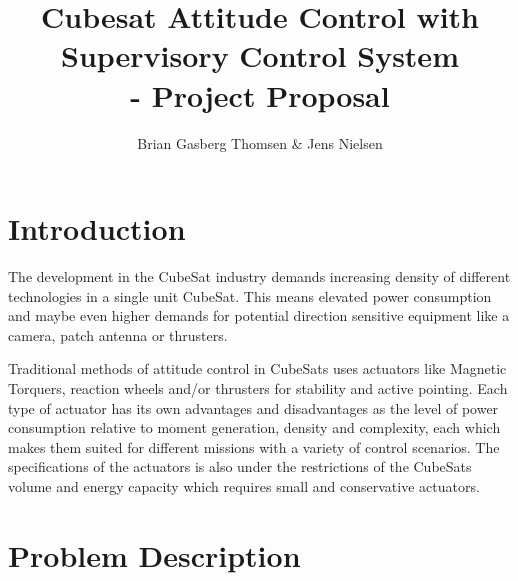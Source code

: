 \documentclass[10pt,a4paper,oneside,openany,article]{memoir}
\title{\vspace{-2cm} Cubesat Attitude Control with Supervisory Control System \\ \Large - Project Proposal}
\author{Brian Gasberg Thomsen \& Jens Nielsen}
\begin{document}
\maketitle

\chapter{Introduction}
The development in the CubeSat industry demands increasing density of different technologies in a single unit CubeSat. This means elevated power consumption and maybe even higher demands for potential direction sensitive equipment like a camera, patch antenna or thrusters. 

Traditional methods of attitude control in CubeSats uses actuators like Magnetic Torquers, reaction wheels and/or thrusters for stability and active pointing. Each type of actuator has its own advantages and disadvantages as the level of power consumption relative to moment generation, density and complexity, each which makes them suited for different missions with a variety of control scenarios. The specifications of the actuators is also under the restrictions of the CubeSats volume and energy capacity which requires small and conservative actuators.







\chapter{Problem Description}

\end{document}

